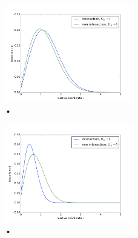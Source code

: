 \documentclass[%
 reprint,
 nobalancelastpage,
 amsmath,amssymb,
 aps,
]{revtex4-1}
\begin{document}
 \begin{figure}[h]
\centering
\includegraphics[width=0.5\textwidth]{../omega1.png}
\caption{•}
\label{fig:my_label}
\end{figure}

 \begin{figure}[h]
\centering
\includegraphics[width=0.5\textwidth]{../omega5.png}
\caption{•}
\label{fig:my_label}
\end{figure}






\end{document}
